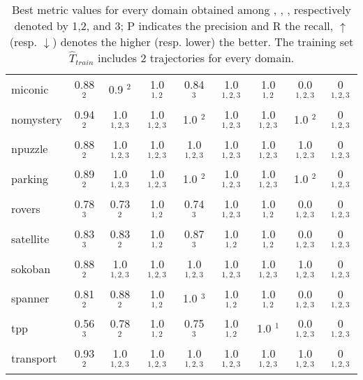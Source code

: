 \begin{table}[h]
{\begin{tabular}{l|c|c|c|c|c|c|c|c}
miconic  & 0.88 $^{2}$ & 0.9 $^{2}$ & 1.0 $^{1,2}$ & 0.84 $^{3}$ & 1.0 $^{1,2,3}$ & 1.0 $^{1,2}$ & 0.0 $^{1,2,3}$ & 0 $^{1,2,3}$ \\
nomystery  & 0.94 $^{2}$ & 1.0 $^{1,2,3}$ & 1.0 $^{1,2,3}$ & 1.0 $^{2}$ & 1.0 $^{1,2,3}$ & 1.0 $^{1,2,3}$ & 1.0 $^{2}$ & 0 $^{1,2,3}$ \\
npuzzle  & 0.88 $^{2}$ & 1.0 $^{1,2,3}$ & 1.0 $^{1,2,3}$ & 1.0 $^{1,2,3}$ & 1.0 $^{1,2,3}$ & 1.0 $^{1,2,3}$ & 1.0 $^{1,2,3}$ & 0 $^{1,2,3}$ \\
parking  & 0.89 $^{2}$ & 1.0 $^{1,2,3}$ & 1.0 $^{1,2,3}$ & 1.0 $^{2}$ & 1.0 $^{1,2,3}$ & 1.0 $^{1,2,3}$ & 1.0 $^{2}$ & 0 $^{1,2,3}$ \\
rovers  & 0.78 $^{3}$ & 0.73 $^{2}$ & 1.0 $^{1,2}$ & 0.74 $^{3}$ & 1.0 $^{1,2,3}$ & 1.0 $^{1,2}$ & 0.0 $^{1,2,3}$ & 0 $^{1,2,3}$ \\
satellite  & 0.83 $^{3}$ & 0.83 $^{2}$ & 1.0 $^{1,2}$ & 0.87 $^{3}$ & 1.0 $^{1,2}$ & 1.0 $^{1,2}$ & 0.0 $^{1,2,3}$ & 0 $^{1,2,3}$ \\
sokoban  & 0.88 $^{2}$ & 1.0 $^{1,2,3}$ & 1.0 $^{1,2,3}$ & 1.0 $^{1,2,3}$ & 1.0 $^{1,2,3}$ & 1.0 $^{1,2,3}$ & 1.0 $^{1,2,3}$ & 0 $^{1,2,3}$ \\
spanner  & 0.81 $^{2}$ & 0.88 $^{2}$ & 1.0 $^{1,2}$ & 1.0 $^{3}$ & 1.0 $^{1,2}$ & 1.0 $^{1,2}$ & 0.0 $^{1,2,3}$ & 0 $^{1,2,3}$ \\
tpp  & 0.56 $^{3}$ & 0.78 $^{2}$ & 1.0 $^{1,2}$ & 0.75 $^{3}$ & 1.0 $^{1,2}$ & 1.0 $^{1}$ & 0.0 $^{1,2,3}$ & 0 $^{1,2,3}$ \\
transport  & 0.93 $^{2}$ & 1.0 $^{1,2,3}$ & 1.0 $^{1,2,3}$ & 1.0 $^{1,2,3}$ & 1.0 $^{1,2,3}$ & 1.0 $^{1,2,3}$ & 1.0 $^{1,2,3}$ & 0 $^{1,2,3}$ \\
\hline
\end{tabular}
}
\caption{Best metric values for every domain obtained among \sam, \offlam, \nolam, respectively denoted by 1,2, and 3; P indicates the precision and R the recall, $\uparrow$ (resp. $\downarrow$) denotes the higher (resp. lower) the better. The training set $\hat{T}_{train}$ includes $2$ trajectories for every domain.}
\end{table}